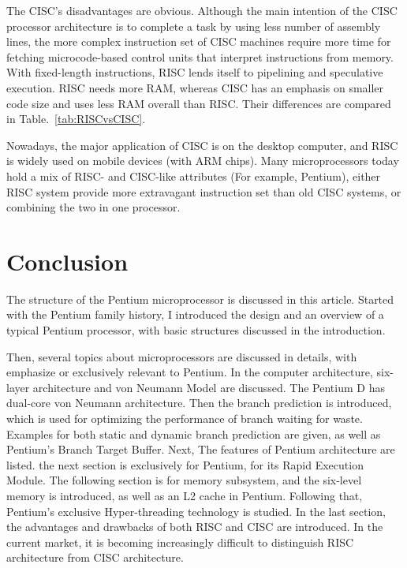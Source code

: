 \documentclass[doc,natbib,12pt]{apa6}
\begin{document}
	The CISC's disadvantages are obvious. Although the main intention of the CISC processor architecture is to complete a task by using less number of assembly lines, the more complex instruction set of CISC machines require more time for fetching microcode-based control units that interpret instructions from memory. With fixed-length instructions, RISC lends itself to pipelining and speculative execution. RISC needs more RAM, whereas CISC has an emphasis on smaller code size and uses less RAM overall than RISC. Their differences are compared in Table.~\vref{tab:RISCvsCISC}.
	
	Nowadays, the major application of CISC is on the desktop computer, and RISC is widely used on mobile devices (with ARM chips). Many microprocessors today hold a mix of RISC- and CISC-like attributes (For example, Pentium), either RISC system provide more extravagant instruction set than old CISC systems, or combining the two in one processor. 
	
	
	
	
	
	
	\newpage
	\section{Conclusion} \label{chp:conclusion}
	The structure of the Pentium microprocessor is discussed in this article. Started with the Pentium family history, I introduced the design and an overview of a typical Pentium processor, with basic structures discussed in the introduction. 
	
	Then, several topics about microprocessors are discussed in details, with emphasize or exclusively relevant to Pentium. In the computer architecture, six-layer architecture and von Neumann Model are discussed. The Pentium D has dual-core von Neumann architecture. Then the branch prediction is introduced, which is used for optimizing the performance of branch waiting for waste. Examples for both static and dynamic branch prediction are given, as well as Pentium's Branch Target Buffer. Next, The features of Pentium architecture are listed. the next section is exclusively for Pentium, for its Rapid Execution Module. The following section is for memory subsystem, and the six-level memory is introduced, as well as an L2 cache in Pentium. Following that, Pentium's exclusive Hyper-threading technology is studied. In the last section, the advantages and drawbacks of both RISC and CISC are introduced. In the current market, it is becoming increasingly difficult to distinguish RISC architecture from CISC architecture.
	
\end{document}
